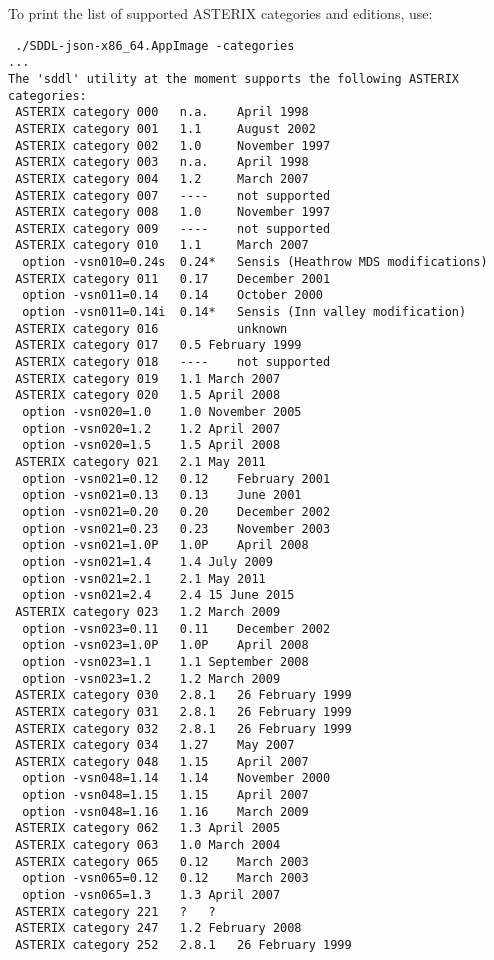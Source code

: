 To print the list of supported ASTERIX categories and editions, use:
\begin{lstlisting}
 ./SDDL-json-x86_64.AppImage -categories
...
The 'sddl' utility at the moment supports the following ASTERIX categories:
 ASTERIX category 000	n.a.	April 1998
 ASTERIX category 001	1.1 	August 2002
 ASTERIX category 002	1.0 	November 1997
 ASTERIX category 003	n.a.	April 1998
 ASTERIX category 004	1.2 	March 2007
 ASTERIX category 007	----	not supported
 ASTERIX category 008	1.0 	November 1997
 ASTERIX category 009	----	not supported
 ASTERIX category 010	1.1 	March 2007
  option -vsn010=0.24s	0.24*	Sensis (Heathrow MDS modifications)
 ASTERIX category 011	0.17	December 2001
  option -vsn011=0.14	0.14	October 2000
  option -vsn011=0.14i	0.14*	Sensis (Inn valley modification)
 ASTERIX category 016	    	unknown
 ASTERIX category 017	0.5	February 1999
 ASTERIX category 018	----	not supported
 ASTERIX category 019	1.1	March 2007
 ASTERIX category 020	1.5	April 2008
  option -vsn020=1.0	1.0	November 2005
  option -vsn020=1.2	1.2	April 2007
  option -vsn020=1.5	1.5	April 2008
 ASTERIX category 021	2.1	May 2011
  option -vsn021=0.12	0.12	February 2001
  option -vsn021=0.13	0.13	June 2001
  option -vsn021=0.20	0.20	December 2002
  option -vsn021=0.23	0.23	November 2003
  option -vsn021=1.0P	1.0P	April 2008
  option -vsn021=1.4	1.4	July 2009
  option -vsn021=2.1	2.1	May 2011
  option -vsn021=2.4	2.4	15 June 2015
 ASTERIX category 023	1.2	March 2009
  option -vsn023=0.11	0.11	December 2002
  option -vsn023=1.0P	1.0P	April 2008
  option -vsn023=1.1	1.1	September 2008
  option -vsn023=1.2	1.2	March 2009
 ASTERIX category 030	2.8.1	26 February 1999
 ASTERIX category 031	2.8.1	26 February 1999
 ASTERIX category 032	2.8.1	26 February 1999
 ASTERIX category 034	1.27	May 2007
 ASTERIX category 048	1.15	April 2007
  option -vsn048=1.14	1.14	November 2000
  option -vsn048=1.15	1.15	April 2007
  option -vsn048=1.16	1.16	March 2009
 ASTERIX category 062	1.3	April 2005
 ASTERIX category 063	1.0	March 2004
 ASTERIX category 065	0.12	March 2003
  option -vsn065=0.12	0.12	March 2003
  option -vsn065=1.3	1.3	April 2007
 ASTERIX category 221	?	?
 ASTERIX category 247	1.2	February 2008
 ASTERIX category 252	2.8.1	26 February 1999
\end{lstlisting}

